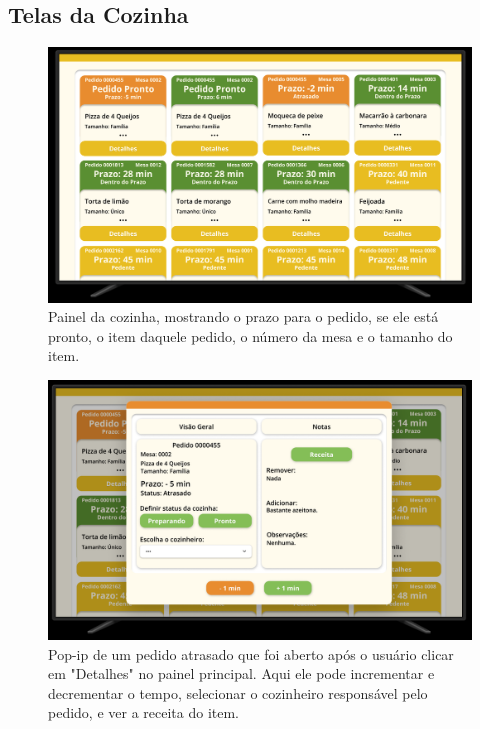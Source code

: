 \begin{center}
    \subsection{Telas da Cozinha}
    \begin{figure}[!htp]
        \includegraphics[width=1\textwidth]{imagens-template/Layout_Cozinha_2622.png}
        \caption{Painel da cozinha, mostrando o prazo para o pedido, se ele está pronto, o item daquele pedido, o número da mesa e o tamanho do item.}
    \end{figure}
    \newpage
    \begin{figure}[!htp]
        \includegraphics[width=1\textwidth]{imagens-template/Layout_Cozinha_2618.png}  
        \caption{Pop-ip de um pedido atrasado que foi aberto após o usuário clicar em "Detalhes" no painel principal. Aqui ele pode incrementar e decrementar o tempo, selecionar o cozinheiro responsável pelo pedido, e ver a receita do item.}
    \end{figure}

\end{center}
